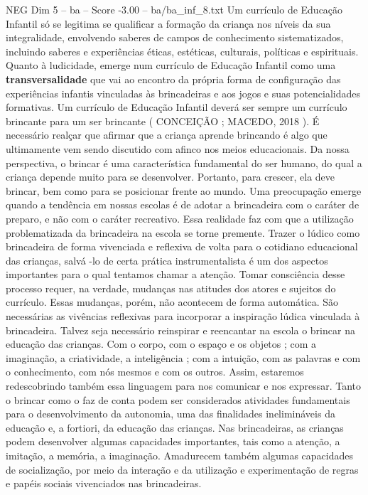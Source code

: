 \begin{textsample}{NEG Dim 5 – ba – Score -3.00 – ba/ba\_inf\_8.txt}
Um currículo de Educação Infantil só se legitima se qualificar a formação da criança nos níveis da sua integralidade, envolvendo saberes de campos de conhecimento sistematizados, incluindo saberes e experiências éticas, estéticas, culturais, políticas e espirituais.
Quanto à ludicidade, emerge num currículo de Educação Infantil como uma \textbf{transversalidade} que vai ao encontro da própria forma de configuração das experiências infantis vinculadas às brincadeiras e aos jogos e suas potencialidades formativas.
Um currículo de Educação Infantil deverá ser sempre um currículo brincante para um ser brincante ( CONCEIÇÃO ; MACEDO, 2018 ).
É necessário realçar que afirmar que a criança aprende brincando é algo que ultimamente vem sendo discutido com afinco nos meios educacionais.
Da nossa perspectiva, o brincar é uma característica fundamental do ser humano, do qual a criança depende muito para se desenvolver.
Portanto, para crescer, ela deve brincar, bem como para se posicionar frente ao mundo.
Uma preocupação emerge quando a tendência em nossas escolas é de adotar a brincadeira com o caráter de preparo, e não com o caráter recreativo.
Essa realidade faz com que a utilização problematizada da brincadeira na escola se torne premente.
Trazer o lúdico como brincadeira de forma vivenciada e reflexiva de volta para o cotidiano educacional das crianças, salvá -lo de certa prática instrumentalista é um dos aspectos importantes para o qual tentamos chamar a atenção.
Tomar consciência desse processo requer, na verdade, mudanças nas atitudes dos atores e sujeitos do currículo.
Essas mudanças, porém, não acontecem de forma automática.
São necessárias as vivências reflexivas para incorporar a inspiração lúdica vinculada à brincadeira.
Talvez seja necessário reinspirar e reencantar na escola o brincar na educação das crianças.
Com o corpo, com o espaço e os objetos ; com a imaginação, a criatividade, a inteligência ; com a intuição, com as palavras e com o conhecimento, com nós mesmos e com os outros.
Assim, estaremos redescobrindo também essa linguagem para nos comunicar e nos expressar.
Tanto o brincar como o faz de conta podem ser considerados atividades fundamentais para o desenvolvimento da autonomia, uma das finalidades inelimináveis da educação e, a fortiori, da educação das crianças.
Nas brincadeiras, as crianças podem desenvolver algumas capacidades importantes, tais como a atenção, a imitação, a memória, a imaginação.
Amadurecem também algumas capacidades de socialização, por meio da interação e da utilização e experimentação de regras e papéis sociais vivenciados nas brincadeiras.

\end{textsample}
